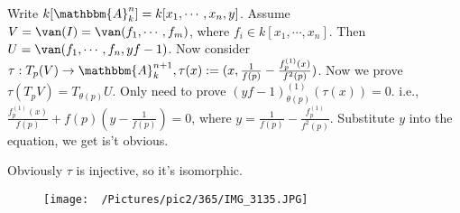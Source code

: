 \documentclass{ctexart}
\begin{document}
\begin{solution}
  Write \(k[\mathbbm{A}_k^n]=k[x_1,\cdots , x_n ,y]\). Assume \(V = \van(I)= \van(f_1,\cdots, f_m)\), where \(f_i \in k[x_1,\cdots,x_n ]\).
  Then \(U = \van(f_1,\cdots,f_n, yf-1)\). Now consider \(\tau: T_p(V) \to \mathbbm{A}_k^{n+1}, \tau(x):=(x,\frac{1}{f(p)}-\frac{f_p^{(1)}(x)}{f^2(p)})\).
  Now we prove \(\tau(T_p V)=T_{\theta(p)} U\).
  Only need to prove \((yf-1)_{\theta(p)}^{(1)}(\tau(x))=0\).
  i.e., \(\frac{f_p^{(1)}(x)}{f(p)}+f(p)(y-\frac{1}{f(p)})=0\), where \(y = \frac{1}{f(p)}-\frac{f_p^{(1)}}{f^2(p)}\).
  Substitute \(y\) into the equation, we get is't obvious.

  Obviously \(\tau\) is injective, so it's isomorphic.
\end{solution}
\begin{figure}
  \centering
  \texttt{[image: ~/Pictures/pic2/365/IMG\_3135.JPG]}
\end{figure}
\end{document}
